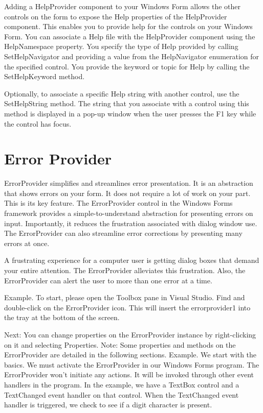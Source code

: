 Adding a HelpProvider component to your Windows Form allows the other controls on the form to expose the Help properties of the HelpProvider component. This enables you to provide help for the controls on your Windows Form. You can associate a Help file with the HelpProvider component using the HelpNamespace property. You specify the type of Help provided by calling SetHelpNavigator and providing a value from the HelpNavigator enumeration for the specified control. You provide the keyword or topic for Help by calling the SetHelpKeyword method.

Optionally, to associate a specific Help string with another control, use the SetHelpString method. The string that you associate with a control using this method is displayed in a pop-up window when the user presses the F1 key while the control has focus.

\section{Error Provider}
ErrorProvider simplifies and streamlines error presentation. It is an abstraction that shows errors
on your form. It does not require a lot of work on your part. This is its key feature. The
ErrorProvider control in the Windows Forms framework provides a simple-to-understand
abstraction for presenting errors on input. Importantly, it reduces the frustration associated with
dialog window use. The ErrorProvider can also streamline error corrections by presenting many
errors at once.

A frustrating experience for a computer user is getting dialog boxes that demand your entire
attention. The ErrorProvider alleviates this frustration. Also, the ErrorProvider can alert the user to
more than one error at a time.

Example. To start, please open the Toolbox pane in Visual Studio. Find and double-click on the
ErrorProvider icon. This will insert the errorprovider1 into the tray at the bottom of the screen.

Next: You can change properties on the ErrorProvider instance by right-clicking on it and selecting
Properties.
Note: Some properties and methods on the ErrorProvider are detailed in the following sections.
Example. We start with the basics. We must activate the ErrorProvider in our Windows Forms
program. The ErrorProvider won't initiate any actions. It will be invoked through other event
handlers in the program.
In the example, we have a TextBox control and a TextChanged event handler on that control. When
the TextChanged event handler is triggered, we check to see if a digit character is present.


